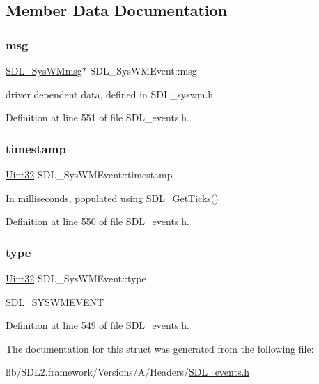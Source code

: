 \subsection{Member Data Documentation}
\mbox{\label{struct_s_d_l___sys_w_m_event_ad5e3dc68aa15582cd0641847d41c74e8}} 
\subsubsection{\texorpdfstring{msg}{msg}}
{\footnotesize\ttfamily \mbox{\hyperlink{struct_s_d_l___sys_w_mmsg}{S\+D\+L\+\_\+\+Sys\+W\+Mmsg}}$\ast$ S\+D\+L\+\_\+\+Sys\+W\+M\+Event\+::msg}

driver dependent data, defined in S\+D\+L\+\_\+syswm.\+h 

Definition at line 551 of file S\+D\+L\+\_\+events.\+h.

\mbox{\label{struct_s_d_l___sys_w_m_event_a5d3cb97006d99b620c2671c27bd82c06}} 
\subsubsection{\texorpdfstring{timestamp}{timestamp}}
{\footnotesize\ttfamily \mbox{\hyperlink{_s_d_l__stdinc_8h_add440eff171ea5f55cb00c4a9ab8672d}{Uint32}} S\+D\+L\+\_\+\+Sys\+W\+M\+Event\+::timestamp}

In milliseconds, populated using \mbox{\hyperlink{_s_d_l__timer_8h_a0b9bc71d6287e0ffafdc3419760fe2b3}{S\+D\+L\+\_\+\+Get\+Ticks()}} 

Definition at line 550 of file S\+D\+L\+\_\+events.\+h.

\mbox{\label{struct_s_d_l___sys_w_m_event_a84697e96cb16bf6a570e10b5bfdcd392}} 
\subsubsection{\texorpdfstring{type}{type}}
{\footnotesize\ttfamily \mbox{\hyperlink{_s_d_l__stdinc_8h_add440eff171ea5f55cb00c4a9ab8672d}{Uint32}} S\+D\+L\+\_\+\+Sys\+W\+M\+Event\+::type}

\mbox{\hyperlink{_s_d_l__events_8h_a3b589e89be6b35c02e0dd34a55f3fccaa73749d735a18ce6ef17a09ee70d5dbe7}{S\+D\+L\+\_\+\+S\+Y\+S\+W\+M\+E\+V\+E\+NT}} 

Definition at line 549 of file S\+D\+L\+\_\+events.\+h.



The documentation for this struct was generated from the following file\+:\begin{DoxyCompactItemize}
\item 
lib/\+S\+D\+L2.\+framework/\+Versions/\+A/\+Headers/\mbox{\hyperlink{_s_d_l__events_8h}{S\+D\+L\+\_\+events.\+h}}\end{DoxyCompactItemize}
